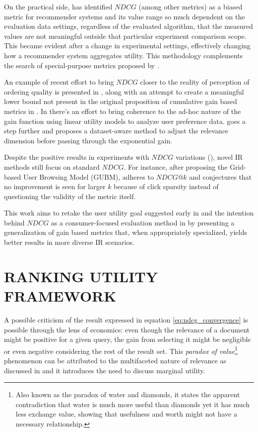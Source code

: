 \documentclass[a4paper, 10pt, conference]{ieeeconf}
\begin{document}
On the practical side, \cite{Bellogin2017} has identified $NDCG$ (among other
metrics) as a biased metric for recommender systems and its value range so much
dependent on the evaluation data settings, regardless of the evaluated
algorithm, that the measured values are not meaningful outside that particular
experiment comparison scope. This became evident after a change in experimental
settings, effectively changing how a recommender system aggregates utility. This
methodology complements the search of special-purpose metrics proposed by
\cite{Steck2011}.

An example of recent effort to bring $NDCG$ closer to the reality of perception
of ordering quality is presented in \cite{Katerenchuk2018}, along with an
attempt to create a meaningful lower bound not present in the original
proposition of cumulative gain based metrics in \cite{Jarvelin2002}. In
\cite{Zhou2014} there's an effort to bring coherence to the ad-hoc nature of the
gain function using linear utility models to analyze user preference data.
\cite{Moniz2016} goes a step further and proposes a dataset-aware method to
adjust the relevance dimension before passing through the exponential gain.

Despite the positive results in experiments with $NDCG$ variations
(\cite{Katerenchuk2018,Zhou2014,Moniz2016}), novel IR methods still focus on
standard $NDCG$. For instance, after proposing the Grid-based User Browsing
Model (GUBM), \cite{Xie2018} adheres to $NDCG@k$ and conjectures that no
improvement is seen for larger $k$ because of click sparsity instead of
questioning the validity of the metric itself.

This work aims to retake the user utility goal suggested early in
\cite{Stephen1978} and the intention behind $NDCG$ as a consumer-focused
evaluation method in \cite{Jarvelin2002} by presenting a generalization of gain
based metrics that, when appropriately specialized, yields better results in
more diverse IR scenarios.

\section{RANKING UTILITY FRAMEWORK}
\label{sec:ranking}

A possible criticism of the result expressed in equation
\ref{eq:ndcg_convergence} is possible through the lens of economics: even though
the relevance of a document might be positive for a given query, the gain from
selecting it might be negligible or even negative considering the rest of the
result set. This \textit{paradox of value}\footnote{Also known as the paradox of
water and diamonds, it states the apparent contradiction that water is much more
useful than diamonds yet it has much less exchange value, showing that
usefulness and worth might not have a necessary relationship.} phenomenon can be
attributed to the multifaceted nature of relevance as discussed in
\cite{Mizzaro1998} and it introduces the need to discuss  marginal utility.
\end{document}
